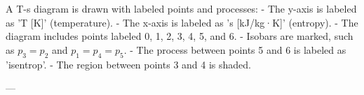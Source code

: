 A T-s diagram is drawn with labeled points and processes:  
- The y-axis is labeled as 'T [K]' (temperature).  
- The x-axis is labeled as 's [kJ/kg·K]' (entropy).  
- The diagram includes points labeled 0, 1, 2, 3, 4, 5, and 6.  
- Isobars are marked, such as \( p_3 = p_2 \) and \( p_1 = p_4 = p_5 \).  
- The process between points 5 and 6 is labeled as 'isentrop'.  
- The region between points 3 and 4 is shaded.  

---